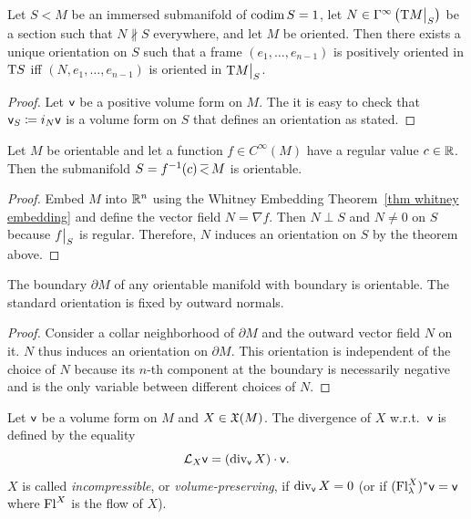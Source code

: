 \begin{thm}\label{thm orientation via normal vector}
    Let $S<M$ be an immersed submanifold of $\operatorname{codim} S=1$, let $N\in\Gamma^\infty\left(\restr{\T M}{S}\right)$ be a section such that $N\not\parallel S$ everywhere, and let $M$ be oriented. Then there exists a unique orientation on $S$ such that a frame $(e_1,\ldots,e_{n-1})$ is positively oriented in $\mathrm{T} S$ iff $(N,e_1,\ldots,e_{n-1})$ is oriented in $\restr{\T M}{S}$.
\end{thm}
\begin{proof}
    Let $\mathsf{v}$ be a positive volume form on $M$. The it is easy to check that $\mathsf{v}_S\coloneqq i_N \mathsf{v}$ is a volume form on $S$ that defines an orientation as stated.
\end{proof}
\begin{cor}
    Let $M$ be orientable and let a function $f\in C^\infty(M)$ have a regular value $c\in \mathbb{R} $. Then the submanifold $S=f^{-1}(c)\emb M$ is orientable.
\end{cor}
\begin{proof}
    Embed $M$ into $\mathbb{R}^n$ using the Whitney Embedding Theorem~\ref{thm whitney embedding} and define the vector field $N=\nabla f$. Then $N\perp S$ and $N\neq 0$ on $S$ because $\restr{f}{S}$ is regular. Therefore, $N$ induces an orientation on $S$ by the theorem above.
\end{proof}
\begin{cor}
    The boundary $\partial M$ of any orientable manifold with boundary is orientable. The standard orientation is fixed by outward normals.
\end{cor}
\begin{proof}
    Consider a collar neighborhood of $\partial M$ and the outward vector field $N$ on it. $N$ thus induces an orientation on $\partial M$. This orientation is independent of the choice of $N$ because its $n$-th component at the boundary is necessarily negative and is the only variable between different choices of $N$.
\end{proof}


\begin{defn}
    Let $\mathsf{v}$ be a volume form on $M$ and $X\in \mathfrak{X}(M)$. The divergence of $X$ w.r.t.\ $\mathsf{v}$ is defined by the equality
    \[\mathcal{L}_X\mathsf{v} =(\operatorname{div}_{\mathsf{v}} X)\cdot \mathsf{v}.\label{eq def divergence}\]
    $X$ is called \emph{incompressible}, or \emph{volume-preserving}, if $\operatorname{div}_{\mathsf{v}} X=0$ (or if $(\mathrm{Fl}^X_\lambda)^\ast\mathsf{v}=\mathsf{v}$ where $\mathrm{Fl}^X$ is the flow of $X$).
\end{defn}


